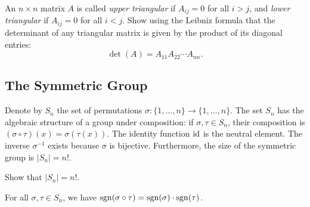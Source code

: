 \begin{exercise}
  \label{exc:triangular_matrix_determinant}
  An $n \times n$ matrix $A$ is called \emph{upper triangular} if $A_{ij} = 0$ for all $i > j$, and \emph{lower triangular} if $A_{ij} = 0$ for all $i < j$. Show using the Leibniz formula that the determinant of any triangular matrix is given by the product of its diagonal entries:
  \[
  \det(A) = A_{11} A_{22} \cdots A_{nn}.
  \]
\end{exercise}

\subsection{The Symmetric Group}

Denote by $S_n$ the set of permutations $\sigma : \{1, \dots, n\} \to \{1, \dots, n\}$. The set $S_n$ has the algebraic structure of a group under composition: if $\sigma, \tau \in S_n$, their composition is $(\sigma \circ \tau)(x) = \sigma(\tau(x))$. The identity function $\operatorname{id}$ is the neutral element. The inverse $\sigma^{-1}$ exists because $\sigma$ is bijective. Furthermore, the size of the symmetric group is $|S_n| = n!$.

\begin{exercise}
  \label{exc:size_of_Sn}
  Show that $|S_n| = n!$.
\end{exercise}


\begin{lemma}
  \label{lem:sgn_multiplicative}
  For all $\sigma, \tau \in S_n$, we have $\operatorname{sgn}(\sigma \circ \tau) = \operatorname{sgn}(\sigma) \cdot \operatorname{sgn}(\tau)$.
\end{lemma}

